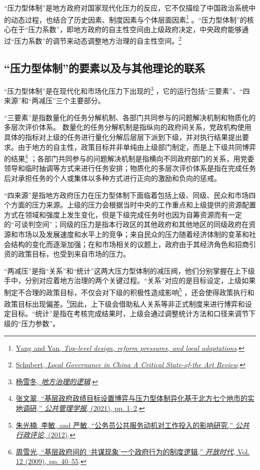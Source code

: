 \documentclass[
  12pt,
]{ctexart}
\begin{document}
``压力型体制''是地方政府对国家现代化压力的反应，它不仅描绘了中国政治系统中的动态过程，也结合了历史因素、制度因素与个体层面因素\footnote{\protect\hyperlink{ref-YangYan2018}{Yang and Yan, \emph{Top-level design, reform pressures, and local adaptations}}.} 。``压力型体制''的核心在于``压力系数''，即地方政府的自主性空间由上级政府决定，中央政府能够通过``压力系数''的调节来动态调整地方治理的自主性空间。\footnote{\protect\hyperlink{ref-Schubert2020}{Schubert, \emph{Local {Governance} in {China} \textendash{} {A Critical State}-of-the {Art Review}}}.}

\hypertarget{ux538bux529bux578bux4f53ux5236ux7684ux8981ux7d20ux4ee5ux53caux4e0eux5176ux4ed6ux7406ux8bbaux7684ux8054ux7cfb}{%
\subsection{``压力型体制''的要素以及与其他理论的联系}\label{ux538bux529bux578bux4f53ux5236ux7684ux8981ux7d20ux4ee5ux53caux4e0eux5176ux4ed6ux7406ux8bbaux7684ux8054ux7cfb}}

``压力型体制''是在现代化和市场化压力下出现的\footnote{\protect\hyperlink{ref-YangXueDong2018}{杨雪冬, \emph{{地方治理的逻辑}}}.} ，它的运行包括``三要素''、``四来源''和``两减压''三个主要部分。

``三要素''是指数量化的任务分解机制、各部门共同参与的问题解决机制和物质化的多层次评价体系。 数量化的任务分解机制是指纵向的政府间关系，党政机构使用具体的指标对上级的任务进行量化分解后层层下派到下级，并对执行结果提出要求。由于地方的自主性，政策目标并非单纯由上级部门制定，而是上下级共同博弈的结果\footnote{\protect\hyperlink{ref-ZhangWenCui2021}{张文翠, {``基层政府政绩目标设置博弈与压力型体制异化\textemdash\textemdash 基于北方七个地市的实地调研,''} \emph{公共管理学报}, (2021), pp. 1--2}.} ；各部门共同参与的问题解决机制是指横向不同政府部门的关系，用党委领导和临时抽调等方式来进行任务安排；物质化的多层次评价体系是指在完成任务后对承担任务的个人或集体以多种方式进行正向的激励和负向的惩戒。

``四来源''是指地方政府压力在压力型体制下面临着包括上级、同级、民众和市场四个方面的压力来源。上级的压力会根据当时中央的工作重点和上级提供的资源配置方式在领域和强度上发生变化，但是下级完成任务时也因为自筹资源而有一定的``可谈判空间''；同级的压力是指本行政区的其他政府和其他地区的同级政府在资源和市场以及发展速度和水平上的竞争；来自民众的压力随着经济体制的变革和社会结构的变化而逐渐加强；在和市场相关的议题上，政府由于其经济角色和招商引资的政策目标，也受到来自市场的压力。

``两减压''是指``关系''和``统计''这两大压力型体制的减压阀，他们分别掌握在上下级手中，分别对应着地方治理的两个关键过程。``关系''对应的是目标设定，上级如果制定不合理的政策目标，不仅会对下级的积极性造成影响\footnote{\protect\hyperlink{ref-ZhuGuangNanEtAl2012}{朱光楠, 李敏, and 严敏, {``公务员公共服务动机对工作投入的影响研究,''} \emph{公共行政评论}, (2012)}.} ，还会使得政策执行和政策目标出现偏差。\footnote{\protect\hyperlink{ref-ZhouXueGuang2009}{周雪光, {``基层政府间的 {`共谋现象'}\textemdash\textemdash 一个政府行为的制度逻辑,''} \emph{开放时代}, Vol. 12 (2009), pp. 40--55}.}因此，上下级会借助私人关系等非正式制度来进行博弈和设定目标。``统计''是指在考核完成结果时，上级会通过调整统计方法和口径来调节下级的``压力参数''。
\end{document}
